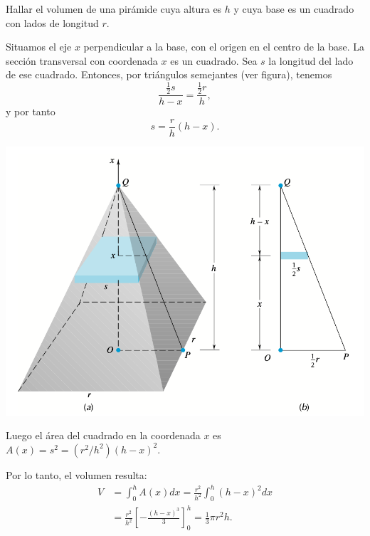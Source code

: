 \begin{example}
  Hallar el volumen de una pirámide cuya altura es \( h \) y cuya base es un cuadrado con lados de longitud \( r \).


  \noindent\begin{minipage}{.6\textwidth}
    Situamos el eje \( x \) perpendicular a la base, con el origen en el centro de la base. La sección transversal con coordenada \( x \) es un cuadrado. Sea \( s \) la longitud del lado de ese cuadrado. Entonces, por triángulos semejantes (ver figura), tenemos
    \[
    \frac{\frac{1}{2}s}{h - x} = \frac{\frac{1}{2}r}{h},
    \]
    y por tanto
    \[
    s = \frac{r}{h}(h - x).
    \]
  
  \end{minipage}
  \begin{minipage}{.39\textwidth}
    \begin{center}
      \includegraphics[width=.9\textwidth]{pics/piramide.png}
    \end{center}
  \end{minipage}
  
  Luego el área del cuadrado en la coordenada $x$ es $A(x) = s^2 = (r^2/h^2)(h-x)^2$.

Por lo tanto, el volumen resulta:
\begin{align*}
  V &= \int_0^h A(x) dx = \frac{r^2}{h^2} \int_0^h (h-x)^2 dx\\
&= \frac{r^2}{h^2} \left[-\frac{(h-x)^3}{3}\right]_0^h = \frac{1}{3} \pi r^2 h.
\end{align*}

\end{example}

